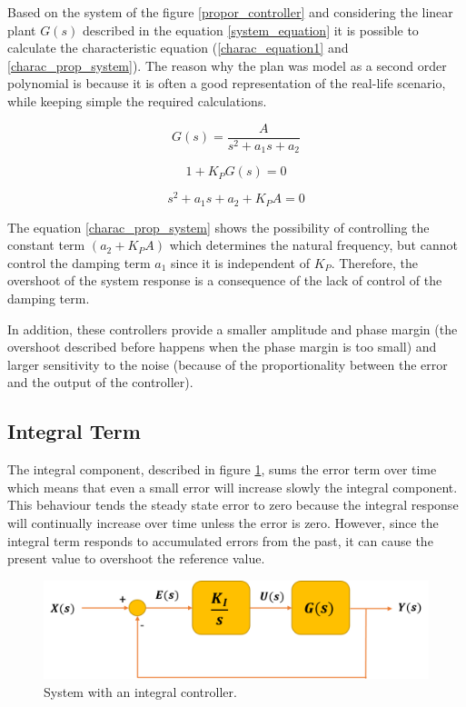 Based on the system of the figure \ref{propor_controller} and considering the linear plant $G(s)$ described in the equation \ref{system_equation} it is possible to calculate the characteristic equation (\ref{charac_equation1} and \ref{charac_prop_system}). The reason why the plan was model as a second order polynomial is because it is often a good representation of the real-life scenario, while keeping simple the required calculations.

\begin{equation}\label{system_equation}
G(s)= \frac{A}{s^2 + a_{1}s + a_{2}}
\end{equation}

\begin{equation}\label{charac_equation1}
1 + K_PG(s)=0
\end{equation}

\begin{equation}\label{charac_prop_system}
s^2 + a_{1}s + a_{2} + K_PA=0
\end{equation}

The equation \ref{charac_prop_system} shows the possibility of controlling the constant term $(a_{2} + K_PA)$ which determines the natural frequency, but cannot control the damping term $a_{1}$ since it is independent of $K_{P}$. Therefore, the overshoot of the system response is a consequence of the lack of control of the damping term.

In addition, these controllers provide a smaller amplitude and phase margin (the overshoot described before happens when the phase margin is too small) and larger sensitivity to the noise (because of the proportionality between the error and the output of the controller).

\subsection*{Integral Term}

The integral component, described in figure \ref{integ_controller}, sums the error term over time which means that even a small error will increase slowly the integral component. This behaviour tends the steady state error to zero because the integral response will continually increase over time unless the error is zero. However, since the integral term responds to accumulated errors from the past, it can cause the present value to overshoot the reference value.

\begin{figure}[H]
	\centering
	\includegraphics[scale=0.6]{figures/integ_controller.png}
	\caption{System with an integral controller.}
	\label{integ_controller}
\end{figure}

